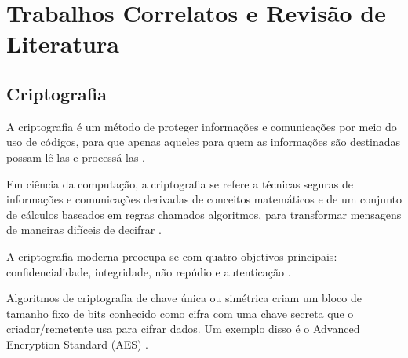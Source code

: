 \newcommand{\texCommand}[1]{\texttt{\textbackslash{#1}}}%

\newcommand{\exemplo}[1]{%
\vspace{\baselineskip}%
\noindent\fbox{\begin{minipage}{\textwidth}#1\end{minipage}}%
\\\vspace{\baselineskip}}%

\newcommand{\exemploVerbatim}[1]{%
\vspace{\baselineskip}%
\noindent\fbox{\begin{minipage}{\textwidth}%
#1\end{minipage}}%
\\\vspace{\baselineskip}}%



\section{Trabalhos Correlatos e Revisão de Literatura}

\subsection{Criptografia} %

A criptografia é um método de proteger informações e comunicações por meio do uso de códigos, para que apenas aqueles para quem as informações são destinadas possam lê-las e processá-las \cite{what_is_cryptography}.

Em ciência da computação, a criptografia se refere a técnicas seguras de informações e comunicações derivadas de conceitos matemáticos e de um conjunto de cálculos baseados em regras chamados algoritmos, para transformar mensagens de maneiras difíceis de decifrar \cite{what_is_cryptography}.

A criptografia moderna preocupa-se com quatro objetivos principais: confidencialidade, integridade, não repúdio e autenticação \cite{what_is_cryptography}.

Algoritmos de criptografia de chave única ou simétrica criam um bloco de tamanho fixo de bits conhecido como cifra com uma chave secreta que o criador/remetente usa para cifrar dados. Um exemplo disso é o Advanced Encryption Standard (AES) \cite{what_is_cryptography}.

